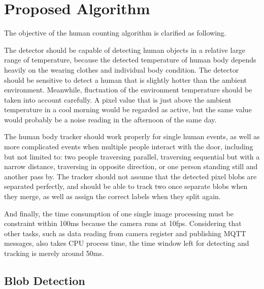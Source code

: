 \chapter{Proposed Algorithm}\label{ch:algorithm}
The objective of the human counting algorithm is clarified as following.

The detector should be capable of detecting human objects in a relative large range of temperature, because the detected temperature of human body depends heavily on the wearing clothes and individual body condition. The detector should be sensitive to detect a human that is slightly hotter than the ambient environment. Meanwhile, fluctuation of the environment temperature should be taken into account carefully. A pixel value that is just above the ambient temperature in a cool morning would be regarded as active, but the same value would probably be a noise reading in the afternoon of the same day.

The human body tracker should work properly for single human events, as well as more complicated events when multiple people interact with the door, including but not limited to: two people traversing parallel, traversing sequential but with a narrow distance, traversing in opposite direction, or one person standing still and another pass by. The tracker should not assume that the detected pixel blobs are separated perfectly, and should be able to track two once separate blobs when they merge, as well as assign the correct labels when they split again.

And finally, the time consumption of one single image processing must be constraint within 100ms because the camera runs at 10fps. Considering that other tasks, such as data reading from camera register and publishing MQTT messages, also takes CPU process time, the time window left for detecting and tracking is merely around 50ms.
\section{Blob Detection} \label{sec:detect}
